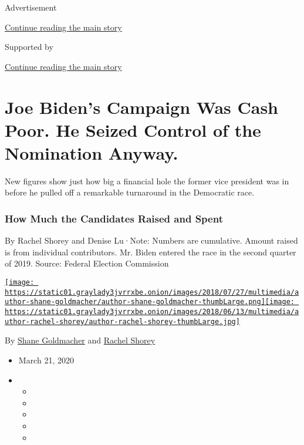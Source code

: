 Advertisement

\protect\hyperlink{after-top}{Continue reading the main story}

Supported by

\protect\hyperlink{after-sponsor}{Continue reading the main story}

\hypertarget{joe-bidens-campaign-was-cash-poor-he-seized-control-of-the-nomination-anyway}{%
\section{Joe Biden's Campaign Was Cash Poor. He Seized Control of the
Nomination
Anyway.}\label{joe-bidens-campaign-was-cash-poor-he-seized-control-of-the-nomination-anyway}}

New figures show just how big a financial hole the former vice president
was in before he pulled off a remarkable turnaround in the Democratic
race.

\hypertarget{how-much-the-candidates-raised-and-spent}{%
\subsubsection{How Much the Candidates Raised and
Spent}\label{how-much-the-candidates-raised-and-spent}}

By Rachel Shorey and Denise Lu·Note: Numbers are cumulative. Amount
raised is from individual contributors. Mr. Biden entered the race in
the second quarter of 2019. \textbar{} Source: Federal Election
Commission

\href{https://www.nytimes3xbfgragh.onion/by/shane-goldmacher}{\texttt{[image: https://static01.graylady3jvrrxbe.onion/images/2018/07/27/multimedia/author-shane-goldmacher/author-shane-goldmacher-thumbLarge.png]}}\href{https://www.nytimes3xbfgragh.onion/by/rachel-shorey}{\texttt{[image: https://static01.graylady3jvrrxbe.onion/images/2018/06/13/multimedia/author-rachel-shorey/author-rachel-shorey-thumbLarge.jpg]}}

By \href{https://www.nytimes3xbfgragh.onion/by/shane-goldmacher}{Shane
Goldmacher} and
\href{https://www.nytimes3xbfgragh.onion/by/rachel-shorey}{Rachel
Shorey}

\begin{itemize}
\item
  March 21, 2020
\item
  \begin{itemize}
  \item
  \item
  \item
  \item
  \item
  \end{itemize}
\end{itemize}

